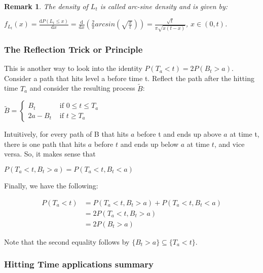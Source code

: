\documentclass[12pt]{article}
\newtheorem*{remark}{Remark}
\begin{document}
\begin{remark}
    The density of $L_t$ is called arc-sine density and is given by:
    \begin{center}
        $f_{L_t}(x)=\frac{\mathrm{d} P(L_t \leq x)}{\mathrm{d} x} = \frac{\mathrm{d} }{\mathrm{d} x} (\frac{2}{\pi}arcsin(\sqrt{\frac{x}{t}})) = \frac{\sqrt{t}}{\pi \sqrt{x(t-x)}}$, $x \in (0,t)$.
    \end{center}
\end{remark}

\subsubsection{The Reflection Trick or Principle}
This is another way to look into the identity $P(T_a < t) = 2P(B_t > a)$. Consider a path that hits level a before time t. Reflect the path after the hitting time $T_a$ and consider the resulting process $\tilde{B}$:
\begin{center}
    $\tilde{B} = \begin{cases}
  B_t &\text{ if } 0 \leq t \leq T_a \\
  2a - B_t &\text{ if } t \geq T_a \end{cases}$
\end{center}
\noindent Intuitively, for every path of B that hits $a$ before t and ends up above $a$ at time t, there is one path that hits $a$ before $t$ and ends up below $a$ at time $t$, and vice versa. So, it makes sense that
\begin{center}
    $P(T_a < t, B_t > a) = P(T_a < t, B_t < a)$
\end{center}
\noindent Finally, we have the following:
\begin{center}
    \begin{align*}
        P(T_a < t) & = P(T_a < t, B_t > a) + P(T_a < t, B_t < a)\\
        & = 2P(T_a < t, B_t > a) \\
        & = 2P(B_t > a)
    \end{align*}
\end{center}
\noindent Note that the second equality follows by $\{B_t > a\} \subseteq \{T_a < t\}$.

\subsubsection{Hitting Time applications summary}
\end{document}
